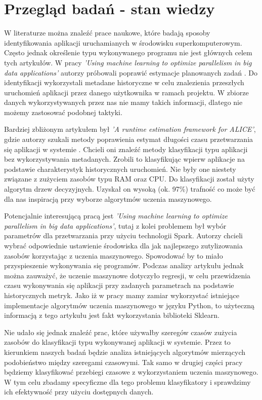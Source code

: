 
\chapter{Przegląd badań - stan wiedzy}
\label{chap:theory}
    W literaturze można znaleźć prace naukowe, które badają sposoby identyfikowania aplikacji uruchamianych w środowisku superkomputerowym. Często jednak określenie typu wykonywanego programu nie jest głównych celem tych artykułów. W pracy \textit{'Using machine learning to optimize parallelism in big data applications'} autorzy próbowali poprawić estymacje planowanych zadań \cite{JobSchedulingSC}. Do identyfikacji wykorzystali metadane historyczne w celu znalezienia przeszłych uruchomień aplikacji przez danego użytkownika w ramach projektu. W zbiorze danych wykorzystywanych przez nas nie mamy takich informacji, dlatego nie możemy zastosować podobnej taktyki. 
    
    Bardziej zbliżonym artykułem był \textit{'A runtime estimation framework for ALICE'}, gdzie autorzy szukali metody poprawienia estymat długości czasu przetwarzania się aplikacji w systemie \cite{RuntimeEstimationALICE}. Chcieli oni znaleźć metody klasyfikacji typu aplikacji bez wykorzystywania metadanych. Zrobili to klasyfikując wpierw aplikacje na podstawie charakterystyk historycznych uruchomień. Nie były one niestety związane z zużyciem zasobów typu RAM oraz CPU. Do klasyfikacji został użyty algorytm drzew decyzyjnych. Uzyskał on wysoką (ok. 97\%) trafność co może być dla nas inspiracją przy wyborze algorytmów uczenia maszynowego.
    
    Potencjalnie interesującą pracą jest \textit{'Using machine learning to optimize parallelism in big data applications'}\cite{BigDataParallelism}, tutaj z kolei problemem był wybór parametrów dla przetwarzania przy użyciu technologii Spark. Autorzy chcieli wybrać odpowiednie ustawienie środowiska dla jak najlepszego zutylizowania zasobów korzystając z uczenia maszynowego. Spowodować by to miało przyspieszenie wykonywania się programów. Podczas analizy artykułu jednak można zauważyć, że uczenie maszynowe dotyczyło regresji, w celu przewidzenia czasu wykonywania się aplikacji przy zadanych parametrach na podstawie historycznych metryk. Jako iż w pracy mamy zamiar wykorzystać istniejące implementacje algorytmów uczenia maszynowego w języku Python, to użyteczną informacją z tego artykułu jest fakt wykorzystania biblioteki Sklearn.
    
    Nie udało się jednak znaleźć prac, które używałby szeregów czasów zużycia zasobów do klasyfikacji typu wykonywanej aplikacji w systemie. Przez to kierunkiem naszych badań będzie analiza istniejących algorytmów mierzących podobieństwo między szeregami czasowymi. Tak samo w drugiej części pracy będziemy klasyfikować przebiegi czasowe z wykorzystaniem uczenia maszynowego. W tym celu zbadamy specyficzne dla tego problemu klasyfikatory i sprawdzimy ich efektywność przy użyciu dostępnych danych.


